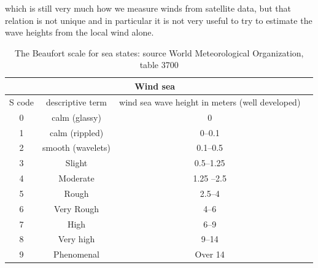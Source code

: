  which is still very much how we measure winds from satellite data, but that relation is not unique and in particular it is not very useful to try to estimate the wave heights from the local wind alone. 


\begin{table}
  \centering
  \begin{tabular}{|c|c|c|c|}
\hline
    \multicolumn{3}{|c|}{Wind sea} \\
 \hline
S code & descriptive term & wind sea wave height in meters (well developed)  \\
0 & calm (glassy)         & 0 \\
1 & calm (rippled)        & 0--0.1\\
2 & smooth (wavelets)     & 0.1--0.5 \\
3 & Slight                & 0.5--1.25  \\
4 & Moderate              & 1.25 --2.5  \\
5 & Rough                 & 2.5--4 \\
6 & Very Rough            & 4--6  \\
7 & High                  & 6--9 \\
8 & Very high             & 9--14  \\
9 & Phenomenal            & Over 14  \\
\hline
\end{tabular}
\caption{The Beaufort scale for sea states: source World Meteorological Organization, table 3700 \label{table_beaufort}}
\label{table_seastate}
\end{table}

